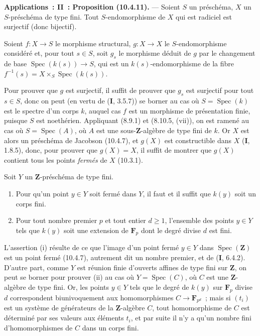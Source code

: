 \begin{env}[10.4.11]
\label{IV.10.4.11-fr}
\textbf{Applications~: II~: Proposition (10.4.11).} --- Soient $S$ un
préschéma, $X$ un $S$-préschéma de type fini. Tout $S$-endomorphisme de $X$
qui est radiciel est surjectif (donc bijectif).
\end{env}

Soient $f:X\to S$ le morphisme structural, $g:X\to X$ le $S$-endomorphisme
considéré et, pour tout $s\in S$, soit $g_s$ le morphisme déduit de $g$ par le
changement de base $\operatorname{Spec}(k(s))\to S$, qui est un
$k(s)$-endomorphisme de la fibre
$f^{-1}(s)=X\times_S\operatorname{Spec}(k(s))$.

Pour prouver que $g$ est surjectif, il suffit de prouver que $g_s$ est
surjectif pour tout $s\in S$, donc on peut (en vertu de (\textbf{I}, 3.5.7))
se borner au cas où $S=\operatorname{Spec}(k)$ est le spectre d'un corps $k$,
auquel cas $f$ est un morphisme de présentation finie, puisque $S$ est
noethérien. Appliquant (8.9.1) et (8.10.5, (vii)), on est ramené au cas où
$S=\operatorname{Spec}(A)$, où $A$ est une sous-$\mathbf Z$-algèbre de type
fini de $k$. Or $X$ est alors un préschéma de Jacobson (10.4.7), et $g(X)$ est
constructible dans $X$ (\textbf{I}, 1.8.5), donc, pour prouver que $g(X)=X$,
il suffit de montrer que $g(X)$ contient tous les points \emph{fermés} de $X$
(10.3.1).

\begin{lemma}[10.4.11.1]
\label{IV.10.4.11.1-fr}
Soit $Y$ un $\mathbf Z$-préschéma de type fini.
\begin{enumerate}[label=(\roman*)]
  \item Pour qu'un point $y\in Y$ soit fermé dans $Y$, il faut et il suffit
  que $k(y)$ soit un corps fini.
  \item Pour tout nombre premier $p$ et tout entier $d\geq1$, l'ensemble des
  points $y\in Y$ tels que $k(y)$ soit une extension de $\mathbf F_p$ dont le
  degré divise $d$ est fini.
\end{enumerate}
\end{lemma}

L'assertion (i) résulte de ce que l'image d'un point fermé $y\in Y$ dans
$\operatorname{Spec}(\mathbf Z)$ est un point fermé (10.4.7), autrement dit
un nombre premier, et de (\textbf{I}, 6.4.2). D'autre part, comme $Y$ est
réunion finie d'ouverts affines de type fini sur $\mathbf Z$, on peut se
borner pour prouver (ii) au cas où $Y=\operatorname{Spec}(C)$, où $C$ est une
$\mathbf Z$-algèbre de type fini. Or, les points $y\in Y$ tels que le degré de
$k(y)$ sur $\mathbf F_p$ divise $d$ correspondent biunivoquement aux
homomorphismes $C\to\mathbf F_{p^d}$~; mais si $(t_i)$ est un système de
générateurs de la $\mathbf Z$-algèbre $C$, tout homomorphisme de $C$ est
déterminé par ses valeurs aux éléments $t_i$, et par suite il n'y a qu'un
nombre fini d'homomorphismes de $C$ dans un corps fini.

